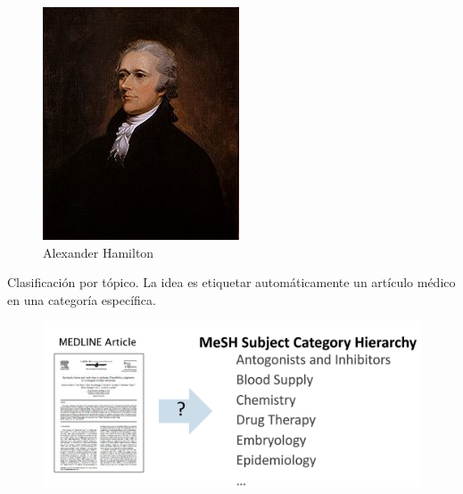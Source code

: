 \documentclass[11pt,fleqn]{book} %
\begin{document}
\begin{example}
\begin{center}
\begin{figure}[h]
\begin{minipage}{0.3\textwidth}
            \includegraphics[width=\linewidth]{pics/hamilton.png}
            \caption{Alexander Hamilton}
        \end{minipage}
    \end{figure}
\end{center}

\end{example}


\begin{example}
Clasificación por tópico. La idea es etiquetar automáticamente un artículo médico en una categoría específica.

\begin{figure}[h]
\includegraphics[scale = 0.2]{pics/medarticle.png}
\end{figure}
 
\end{example}
\end{document}
